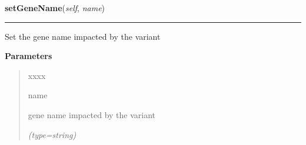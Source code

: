     \label{script-phyloFixedVar:var:setGeneName}

    \vspace{0.5ex}

\hspace{.8\funcindent}\begin{boxedminipage}{\funcwidth}

    \raggedright \textbf{setGeneName}(\textit{self}, \textit{name})

    \vspace{-1.5ex}

    \rule{\textwidth}{0.5\fboxrule}
\setlength{\parskip}{2ex}
    Set the gene name impacted by the variant

\setlength{\parskip}{1ex}
      \textbf{Parameters}
      \vspace{-1ex}

      \begin{quote}
        \begin{Ventry}{xxxx}

          \item[name]

          gene name impacted by the variant

            {\it (type=string)}

        \end{Ventry}

      \end{quote}

    \end{boxedminipage}

    \label{script-phyloFixedVar:var:setTranscritID}

    \vspace{0.5ex}

